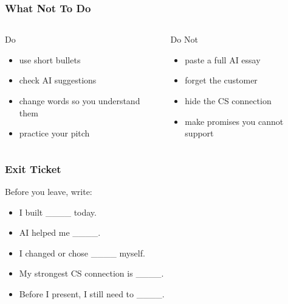 \documentclass[aspectratio=169]{beamer}
\begin{document}
\begin{frame}[plain]
\frametitle{What Not To Do}
\begin{columns}[T,totalwidth=\textwidth]
\begin{block}{Do}
\begin{itemize}
\large
\item use short bullets
\item check AI suggestions
\item change words so you understand them
\item practice your pitch
\end{itemize}
\end{block}
\begin{block}{Do Not}
\begin{itemize}
\large
\item paste a full AI essay
\item forget the customer
\item hide the CS connection
\item make promises you cannot support
\end{itemize}
\end{block}
\end{columns}
\end{frame}

\begin{frame}[plain]
\frametitle{Exit Ticket}
\begin{block}{Before you leave, write:}
\begin{itemize}
\large
\item I built \_\_\_\_ today.
\item AI helped me \_\_\_\_.
\item I changed or chose \_\_\_\_ myself.
\item My strongest CS connection is \_\_\_\_.
\item Before I present, I still need to \_\_\_\_.
\end{itemize}
\end{block}
\end{frame}
\end{document}
